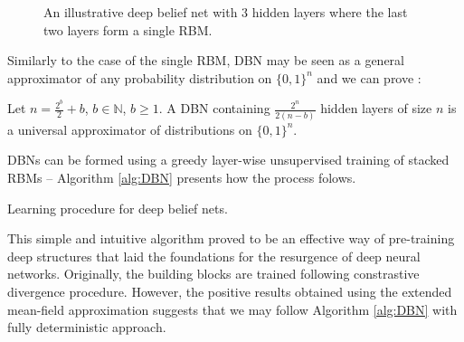 \begin{figure}[!h]
\begin{center}
  \caption[An illustrative deep belief net]{An illustrative deep belief net with $3$ hidden layers where the last two layers form a single RBM.}
    \label{fig:DBN}
\end{center}
\end{figure}

Similarly to the case of the single RBM, DBN may be seen as a general approximator of any probability distribution on $\{0,1 \}^n$ and we can prove \cite{montufar2010refinements}
:
\begin{theorem} [Guido-Ay, 2010] Let $n = \frac{2^b}{2} + b$, $b \in \mathbb{N}$, $b \geqslant 1$. A DBN containing $\frac{2^n}{2(n-b)}$ hidden layers of size $n$ is a universal approximator of distributions on $\{0,1 \}^n$.
\end{theorem}

DBNs can be formed using a greedy layer-wise unsupervised training of stacked RBMs -- Algorithm \ref{alg:DBN} presents how the process folows.
\begin{algorithm}[!bthp]
\caption{Learning procedure for deep belief nets.}
\label{alg:DBN}
\begin{algorithmic}
\EndFor
\end{algorithmic}
\end{algorithm}
This simple and intuitive algorithm proved to be an effective way of pre-training deep structures that laid the foundations for the resurgence of deep neural networks. Originally, the building blocks are trained following constrastive divergence 
procedure.  However, the positive results obtained using the extended mean-field approximation suggests that we may follow Algorithm \ref{alg:DBN} with fully deterministic approach.

